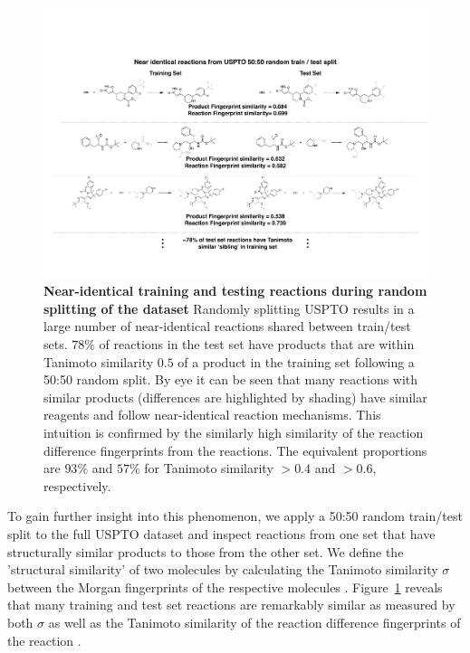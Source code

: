 \begin{figure}[ht!]
    \centering
    \includegraphics[width=\textwidth]{Chapters/Transformer/Figs/siblings_alt.pdf}
    \caption{\label{fig:sibling} \textbf{Near-identical training and testing reactions during random splitting of the dataset} Randomly splitting USPTO results in a large number of near-identical reactions shared between train/test sets. $78\%$ of reactions in the test set have products that are within Tanimoto similarity $0.5$ of a product in the training set following a 50:50 random split. By eye it can be seen that many reactions with similar products (differences are highlighted by shading) have similar reagents and follow near-identical reaction mechanisms. This intuition is confirmed by the similarly high similarity of the reaction difference fingerprints from the reactions. The equivalent proportions are $93\%$ and $57\%$ for Tanimoto similarity $>0.4$ and $>0.6$, respectively.}
\end{figure}

To gain further insight into this phenomenon, we apply a 50:50 random train/test split to the full USPTO dataset and inspect reactions from one set that have structurally similar products to those from the other set. We define the 'structural similarity' of two molecules by calculating the Tanimoto similarity $\sigma$ between the Morgan fingerprints of the respective molecules \cite{Bajusz2015Tanimoto}. Figure~\ref{fig:sibling} reveals that many training and test set reactions are remarkably similar as measured by both $\sigma$ as well as the Tanimoto similarity of the reaction difference fingerprints of the reaction \cite{Schneider2015rxnfp}.

